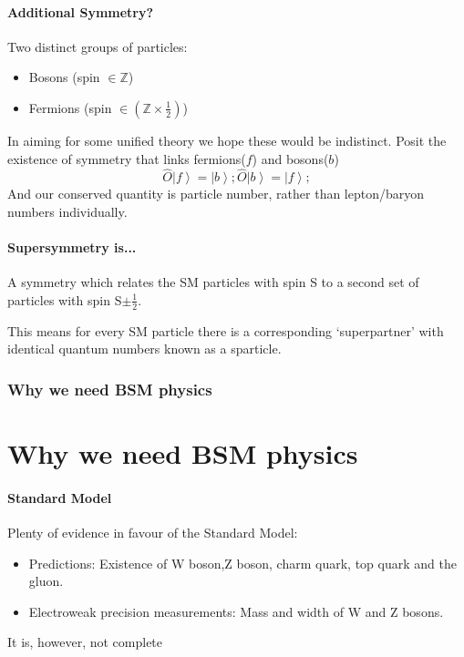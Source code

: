 \documentclass{beamer}
\begin{document}
\subsection{Additional Symmetry?}
\begin{frame}{\insertsubsection}
  Two distinct groups of particles:
  \begin{itemize}
    \item Bosons (spin $\in\mathbb{Z}$)
    \item Fermions (spin $\in(\mathbb{Z}\times\frac{1}{2})$)
  \end{itemize}
  In aiming for some unified theory we hope these would be indistinct.
  Posit the existence of symmetry that links fermions($f$) and bosons($b$)
  \begin{equation*}
    \hat{O}\left|f\right>=\left|b\right>;\hat{O}\left|b\right>=\left|f\right>;
  \end{equation*}
  And our conserved quantity is particle number, rather than lepton/baryon
  numbers individually.
\end{frame}

\subsection{Supersymmetry is...}
\begin{frame}{\insertsubsection}
  \begin{definition}{}
    A symmetry which relates the SM particles with spin \alert{S} to a second
    set of particles with spin \alert{S$\pm\frac{1}{2}$}.
  \end{definition}
  This means for every SM particle there is a corresponding `superpartner' with
  identical quantum numbers known as a \alert{sparticle}.
\end{frame}

\section{Why we need BSM physics}
\part{Why we need BSM physics}
\frame{\partpage}
\subsection{Standard Model}
\begin{frame}{\insertsubsection}
  Plenty of evidence in favour of the Standard Model:
  \begin{itemize}
    \item Predictions: Existence of W boson,Z boson, charm quark, top quark and the gluon.
    \item Electroweak precision measurements: Mass and width of W and Z bosons.
  \end{itemize}
  It is, however, not complete
\end{frame}
\end{document}

